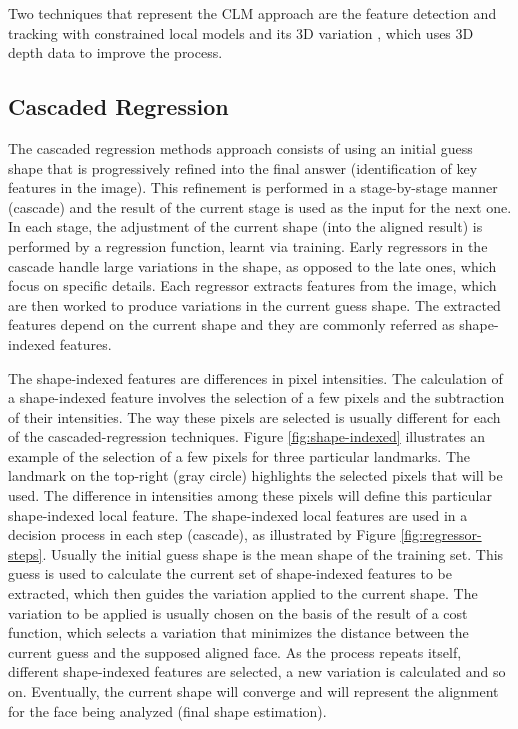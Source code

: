 Two techniques that represent the CLM approach are the feature detection and tracking with constrained local models \parencite{cristinacce2006feature} and its 3D variation \parencite{baltruvsaitis20123d}, which uses 3D depth data to improve the process.

\subsection{Cascaded Regression}

The cascaded regression methods approach consists of using an initial guess shape that is progressively refined into the final answer (identification of key features in the image). This refinement is performed in a stage-by-stage manner (cascade) and the result of the current stage is used as the input for the next one. In each stage, the adjustment of the current shape (into the aligned result) is performed by a regression function, learnt via training. Early regressors in the cascade handle large variations in the shape, as opposed to the late ones, which focus on specific details. Each regressor extracts features from the image, which are then worked to produce variations in the current guess shape. The extracted features depend on the current shape and they are commonly referred as shape-indexed features.

The shape-indexed features are differences in pixel intensities. The calculation of a shape-indexed feature involves the selection of a few pixels and the subtraction of their intensities. The way these pixels are selected is usually different for each of the cascaded-regression techniques. Figure \ref{fig:shape-indexed} illustrates an example of the selection of a few pixels for three particular landmarks. The landmark on the top-right (gray circle) highlights the selected pixels that will be used. The difference in intensities among these pixels will define this particular shape-indexed local feature. The shape-indexed local features are used in a decision process in each step (cascade), as illustrated by Figure \ref{fig:regressor-steps}. Usually the initial guess shape is the mean shape of the training set. This guess is used to calculate the current set of shape-indexed features to be extracted, which then guides the variation applied to the current shape. The variation to be applied is usually chosen on the basis of the result of a cost function, which selects a variation that minimizes the distance between the current guess and the supposed aligned face. As the process repeats itself, different shape-indexed features are selected, a new variation is calculated and so on. Eventually, the current shape will converge and will represent the alignment for the face being analyzed (final shape estimation).

